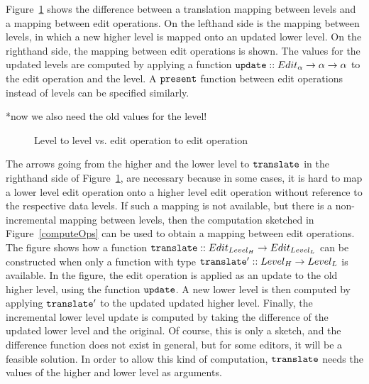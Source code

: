 Figure~\ref{fromLevelToOp} shows the difference between a translation mapping between levels and a mapping between edit operations. On the lefthand side is the mapping between levels, in which a new higher level is mapped onto an updated lower level. On the righthand side, the mapping between edit operations is shown. The values for the updated levels are computed by applying a function
 ${\tt update} :: Edit_\alpha \rightarrow \alpha \rightarrow \alpha$ to the edit operation and the level. A 
 ${\tt present}$ function between edit operations instead of levels can be specified similarly.

*now we also need the old values for the level!

\begin{figure}
\begin{small}
\begin{center}
\begin{center}
\end{center}\caption{Level to level vs. edit operation to edit operation }\label{fromLevelToOp} 
\end{center}
\end{small}
\end{figure}


The arrows going from the higher and the lower level to ${\tt translate}$ in the righthand side of Figure~\ref{fromLevelToOp}, are necessary because in some cases, it is hard to map a lower level edit operation onto a higher level edit operation without reference to the respective data levels. If such a mapping is not available, but there is a non-incremental mapping between levels, then the computation sketched in Figure~\ref{computeOps} can be used to obtain a mapping between edit operations. The figure shows how a function ${\tt translate} :: Edit_{Level_{H}} \rightarrow Edit_{Level_{L}}$ can be constructed when only a function with type ${\tt translate'} :: Level_{H} \rightarrow Level_{L}$  is available. In the figure, the edit operation is applied as an update to the old higher level, using the function ${\tt update}$. A new lower level is then computed by applying ${\tt translate'}$ to the updated updated higher level. Finally, the incremental lower level update is computed by taking the difference of the updated lower level and the original. Of course, this is only a sketch, and the difference function does not exist in general, but for some editors, it will be a feasible solution. In order to allow this kind of computation, ${\tt translate}$ needs the values of the higher and lower level as arguments.

